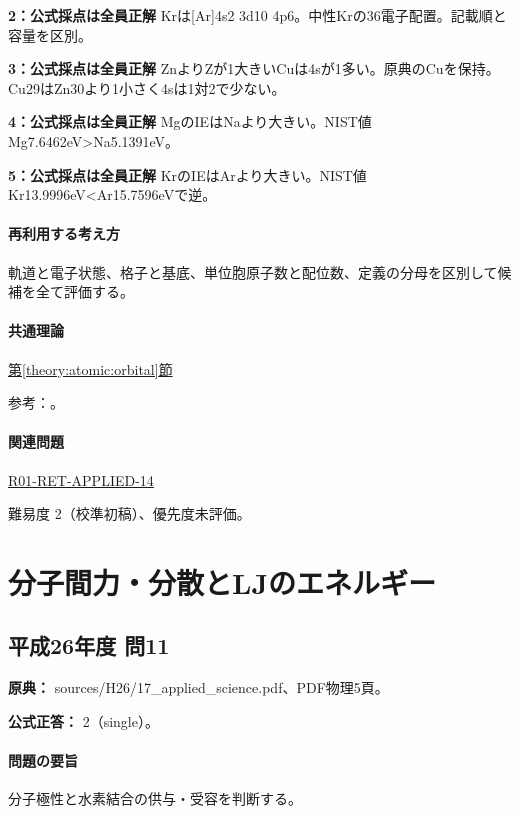 \noindent\textbf{2：公式採点は全員正解} Krは[Ar]4s2 3d10 4p6。中性Krの36電子配置。記載順と容量を区別。\par

\noindent\textbf{3：公式採点は全員正解} ZnよりZが1大きいCuは4sが1多い。原典のCuを保持。Cu29はZn30より1小さく4sは1対2で少ない。\par

\noindent\textbf{4：公式採点は全員正解} MgのIEはNaより大きい。NIST値Mg7.6462eV>Na5.1391eV。\par

\noindent\textbf{5：公式採点は全員正解} KrのIEはArより大きい。NIST値Kr13.9996eV<Ar15.7596eVで逆。\par

\paragraph{再利用する考え方} 軌道と電子状態、格子と基底、単位胞原子数と配位数、定義の分母を区別して候補を全て評価する。

\paragraph{共通理論} \hyperref[theory:atomic:orbital]{第\ref*{theory:atomic:orbital}節}

\par 参考：\cite{atomic_nist2019}。

\paragraph{関連問題} \hyperref[q:r01-ret-applied-14]{R01-RET-APPLIED-14}

\par 難易度 2（校準初稿）、優先度未評価。

\section{分子間力・分散とLJのエネルギー}

\subsection{平成26年度 問11}
\label{q:h26-reg-applied-11}

\noindent\textbf{原典：} sources/H26/17\_applied\_science.pdf、PDF物理5頁。

\textbf{公式正答：} 2（single）。

\paragraph{問題の要旨} 分子極性と水素結合の供与・受容を判断する。

